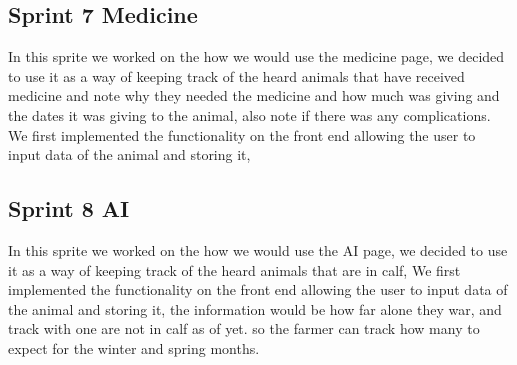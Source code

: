\documentclass[12pt,a4paper,oneside,openany]{book}
\begin{document}
\subsection{Sprint 7 Medicine}
In this sprite we worked on the how we would use the medicine page, we decided to use it as a way of keeping track of the heard animals that have received medicine and note why they needed the medicine and how much was giving and the dates it was giving to the animal, also note if there was any complications. We first implemented the functionality on the front end allowing the user to input data of the animal and storing it,

\subsection{Sprint 8 AI}
In this sprite we worked on the how we would use the AI page, we decided to use it as a way of keeping track of the heard animals that are in calf, We first implemented the functionality on the front end allowing the user to input data of the animal and storing it, the information would be how far alone they war, and track with one are not in calf as of yet. so the farmer can track how many to expect for the winter and spring months.




\end{document}
